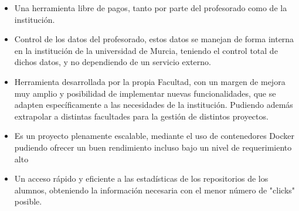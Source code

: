 \begin{itemize}
	\item Una herramienta libre de pagos, tanto por parte del profesorado como de la institución.
	\item Control de los datos del profesorado, estos datos se manejan de forma interna en la institución de la universidad de Murcia, teniendo el control total de dichos datos, y no dependiendo de un servicio externo.
	\item Herramienta desarrollada por la propia Facultad, con un margen de mejora muy amplio y posibilidad de implementar nuevas funcionalidades, que se adapten específicamente a las necesidades de la institución. Pudiendo además extrapolar a distintas facultades para la gestión de distintos proyectos.
	\item Es un proyecto plenamente escalable, mediante el uso de contenedores Docker pudiendo ofrecer un buen rendimiento incluso bajo un nivel de requerimiento alto
	\item Un acceso rápido y eficiente a las estadísticas de los repositorios de los alumnos, obteniendo la información necesaria con el menor número de "clicks" posible.
\end{itemize}

